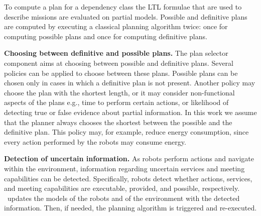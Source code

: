 To compute a plan for a dependency class the  LTL formulae that are used to describe missions are evaluated on partial models.
Possible and definitive plans are computed by executing a classical planning algorithm twice: once for computing possible plans and once for computing definitive plans.



\textbf{Choosing between definitive and possible plans.}
The plan selector component aims at choosing between possible and definitive plans.
Several policies can be applied to choose between these plans.
Possible plans can be chosen only in cases in which a definitive plan is  not present.
Another policy may choose the plan with the shortest length, or it may consider non-functional aspects of the plans e.g., time to perform certain actions, or likelihood of detecting true or false evidence about partial information. 
In this work we assume  that the planner always chooses the shortest between the possible and the definitive plan.
This policy may, for example, reduce energy consumption, since every action performed by the robots may consume energy. 

\textbf{Detection of uncertain information.}
As robots perform actions and navigate within the environment, information regarding uncertain services and meeting capabilities can be detected.
Specifically, robots detect whether actions, services, and meeting capabilities are executable, provided, and possible, respectively.
\toolName\ updates the models of the robots and of the environment with the detected information.
Then, if needed, the planning algorithm is triggered and re-executed.






